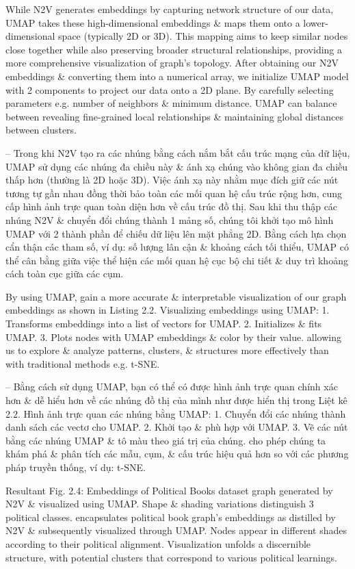 \documentclass{article}
\begin{document}
\begin{itemize}
\begin{itemize}
\begin{itemize}
           While N2V generates embeddings by capturing network structure of our data, UMAP takes these high-dimensional embeddings \& maps them onto a lower-dimensional space (typically 2D or 3D). This mapping aims to keep similar nodes close together while also preserving broader structural relationships, providing a more comprehensive visualization of graph's topology. After obtaining our N2V embeddings \& converting them into a numerical array, we initialize UMAP model with 2 components to project our data onto a 2D plane. By carefully selecting parameters e.g. number of neighbors \& minimum distance. UMAP can balance between revealing fine-grained local relationships \& maintaining global distances between clusters.

           -- Trong khi N2V tạo ra các nhúng bằng cách nắm bắt cấu trúc mạng của dữ liệu, UMAP sử dụng các nhúng đa chiều này \& ánh xạ chúng vào không gian đa chiều thấp hơn (thường là 2D hoặc 3D). Việc ánh xạ này nhằm mục đích giữ các nút tương tự gần nhau đồng thời bảo toàn các mối quan hệ cấu trúc rộng hơn, cung cấp hình ảnh trực quan toàn diện hơn về cấu trúc đồ thị. Sau khi thu thập các nhúng N2V \& chuyển đổi chúng thành 1 mảng số, chúng tôi khởi tạo mô hình UMAP với 2 thành phần để chiếu dữ liệu lên mặt phẳng 2D. Bằng cách lựa chọn cẩn thận các tham số, ví dụ: số lượng lân cận \& khoảng cách tối thiểu, UMAP có thể cân bằng giữa việc thể hiện các mối quan hệ cục bộ chi tiết \& duy trì khoảng cách toàn cục giữa các cụm.

           By using UMAP, gain a more accurate \& interpretable visualization of our graph embeddings as shown in {\sf Listing 2.2. Visualizing embeddings using UMAP: 1. Transforms embeddings into a list of vectors for UMAP. 2. Initializes \& fits UMAP. 3. Plots nodes with UMAP embeddings \& color by their value.} allowing us to explore \& analyze patterns, clusters, \& structures more effectively than with traditional methods e.g. t-SNE.

           -- Bằng cách sử dụng UMAP, bạn có thể có được hình ảnh trực quan chính xác hơn \& dễ hiểu hơn về các nhúng đồ thị của mình như được hiển thị trong {\sf Liệt kê 2.2. Hình ảnh trực quan các nhúng bằng UMAP: 1. Chuyển đổi các nhúng thành danh sách các vectơ cho UMAP. 2. Khởi tạo \& phù hợp với UMAP. 3. Vẽ các nút bằng các nhúng UMAP \& tô màu theo giá trị của chúng.} cho phép chúng ta khám phá \& phân tích các mẫu, cụm, \& cấu trúc hiệu quả hơn so với các phương pháp truyền thống, ví dụ: t-SNE.

           Resultant {\sf Fig. 2.4: Embeddings of Political Books dataset graph generated by N2V \& visualized using UMAP. Shape \& shading variations distinguish 3 political classes.} encapsulates political book graph's embeddings as distilled by N2V \& subsequently visualized through UMAP. Nodes appear in different shades according to their political alignment. Visualization unfolds a discernible structure, with potential clusters that correspond to various political learnings.


\end{itemize}
\end{itemize}
\end{itemize}
\end{document}
